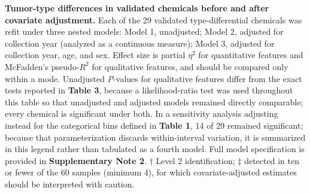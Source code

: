\textbf{Tumor-type differences in validated chemicals before and after covariate adjustment.} Each of the 29 validated type-differential chemicals was refit under three nested models: Model 1, unadjusted; Model 2, adjusted for collection year (analyzed as a continuous measure); Model 3, adjusted for collection year, age, and sex. Effect size is partial $\eta^{2}$ for quantitative features and McFadden's pseudo-$R^{2}$ for qualitative features, and should be compared only within a mode. Unadjusted \textit{P}-values for qualitative features differ from the exact tests reported in \textbf{Table 3}, because a likelihood-ratio test was used throughout this table so that unadjusted and adjusted models remained directly comparable; every chemical is significant under both. In a sensitivity analysis adjusting instead for the categorical bins defined in \textbf{Table 1}, 14 of 29 remained significant; because that parameterization discards within-interval variation, it is summarized in this legend rather than tabulated as a fourth model. Full model specification is provided in \textbf{Supplementary Note 2}. $\dagger$ Level 2 identification; $\ddagger$ detected in ten or fewer of the 60 samples (minimum 4), for which covariate-adjusted estimates should be interpreted with caution.

